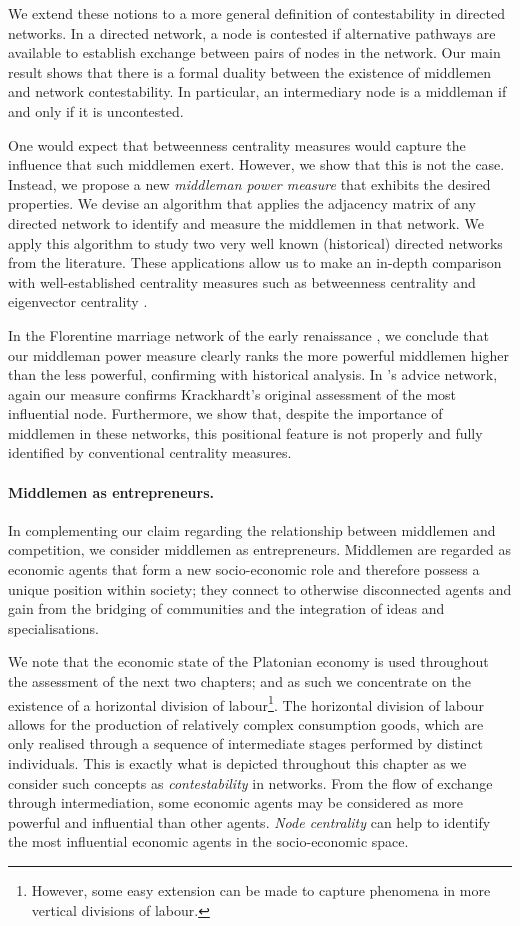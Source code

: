 We extend these notions to a more general definition of contestability in directed networks. In a directed network, a node is contested if alternative pathways are available to establish exchange between pairs of nodes in the network. Our main result shows that there is a formal duality between the existence of middlemen and network contestability. In particular, an intermediary node is a middleman if and only if it is uncontested.

One would expect that betweenness centrality measures would capture the influence that such middlemen exert. However, we show that this is not the case. Instead, we propose a new \emph{middleman power measure} that exhibits the desired properties. We devise an algorithm that applies the adjacency matrix of any directed network to identify and measure the middlemen in that network. We apply this algorithm to study two very well known (historical) directed networks from the literature. These applications allow us to make an in-depth comparison with well-established centrality measures such as betweenness centrality and eigenvector centrality \citep{Bonacich1987}.

In the Florentine marriage network of the early renaissance \citep{Padgett1993, Padgett1994}, we conclude that our middleman power measure clearly ranks the more powerful middlemen higher than the less powerful, confirming with historical analysis. In \citet{Krackhardt1987}'s advice network, again our measure confirms Krackhardt's original assessment of the most influential node. Furthermore, we show that, despite the importance of middlemen in these networks, this positional feature is not properly and fully identified by conventional centrality measures.

\paragraph{Middlemen as entrepreneurs.}

In complementing our claim regarding the relationship between middlemen and competition, we consider middlemen as entrepreneurs. Middlemen are regarded as economic agents that form a new socio-economic role and therefore possess a unique position within society; they connect to otherwise disconnected agents and gain from the bridging of communities and the integration of ideas and specialisations.

We note that the economic state of the Platonian economy is used throughout the assessment of the next two chapters; and as such we concentrate on the existence of a horizontal division of labour\footnote{However, some easy extension can be made to capture phenomena in more vertical divisions of labour.}. The horizontal division of labour allows for the production of relatively complex consumption goods, which are only realised through a sequence of intermediate stages performed by distinct individuals. This is exactly what is depicted throughout this chapter as we consider such concepts as \emph{contestability} in networks. From the flow of exchange through intermediation, some economic agents may be considered as more powerful and influential than other agents. \emph{Node centrality} can help to identify the most influential economic agents in the socio-economic space.

